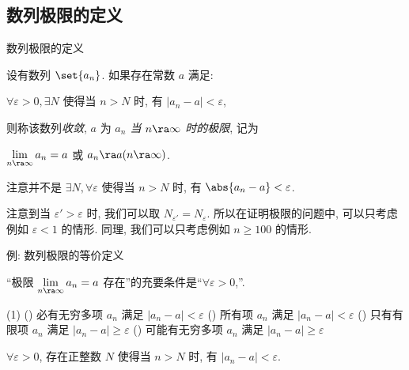 \subsection{数列极限的定义}
\begin{frame}{数列极限的定义}
	\onslide<+->
	\begin{definition*}
		设有数列 $\set{a_n}$. 如果存在常数 $a$ 满足:
		\begin{center}
			\alert{$\forall\varepsilon>0, \exists N$ 使得当 $n>N$ 时, 有 $|a_n-a|<\varepsilon$},
		\end{center}
		则称该数列\emph{收敛}, $a$ 为 \emph{$a_n$ 当 $n \ra \infty$ 时的极限}, 记为
		\begin{center}
			\emph{$\lim\limits_{n\ra\infty}a_n=a$} 或 $a_n\ra a (n\ra \infty)$.
		\end{center}

	\end{definition*}
	\onslide<+->
	注意并不是 $\exists N,\forall\varepsilon$ 使得当 $n>N$ 时, 有 $\abs{a_n-a}<\varepsilon$.
	
	\onslide<+->
	注意到当 $\varepsilon'>\varepsilon$ 时, 我们可以取 $N_{\varepsilon'}=N_\varepsilon$.
	\onslide<+->
	所以在证明极限的问题中, 可以只考虑例如 $\varepsilon<1$ 的情形.
	\onslide<+->
	同理, 我们可以只考虑例如 $n\ge 100$ 的情形.
\end{frame}


\begin{frame}{例: 数列极限的等价定义}
	\onslide<+->
	\begin{example}
		“极限 $\lim\limits_{n\ra\infty}a_n=a$ 存在”的充要条件是“$\forall\varepsilon>0$,”.
		\begin{taskschoice}(1)
			() 必有无穷多项 $a_n$ 满足 $|a_n-a|<\varepsilon$
			() 所有项 $a_n$ 满足 $|a_n-a|<\varepsilon$
			() 只有有限项 $a_n$ 满足 $|a_n-a|\ge \varepsilon$
			() 可能有无穷多项 $a_n$ 满足 $|a_n-a|\ge \varepsilon$
		\end{taskschoice}
	\end{example}
	\onslide<+->
	\begin{solution}
		$\forall\varepsilon>0$, 存在正整数 $N$ 使得当 $n>N$ 时, 有 $|a_n-a|<\varepsilon$.
		\onslide<+->{对于 A , 反例 $a_n=(-1)^n, a=1$.}
	\end{solution}
\end{frame}


